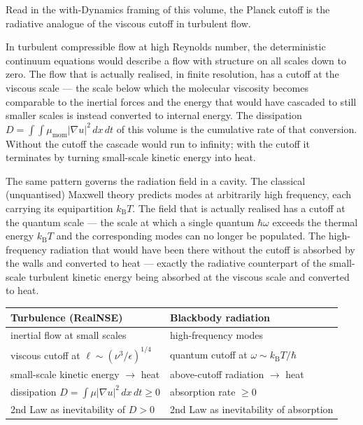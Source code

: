 Read in the with-Dynamics framing of this volume, the Planck cutoff is
the radiative analogue of the viscous cutoff in turbulent flow.

In turbulent compressible flow at high Reynolds number, the
deterministic continuum equations would describe a flow with structure
on all scales down to zero. The flow that is actually realised, in
finite resolution, has a cutoff at the viscous scale --- the scale
below which the molecular viscosity becomes comparable to the inertial
forces and the energy that would have cascaded to still smaller scales
is instead converted to internal energy. The dissipation
$D = \int\!\int \mu_{\mathrm{mom}}|\nabla u|^2\,dx\,dt$ of this volume
is the cumulative rate of that conversion. Without the cutoff the
cascade would run to infinity; with the cutoff it terminates by
turning small-scale kinetic energy into heat.

The same pattern governs the radiation field in a cavity. The
classical (unquantised) Maxwell theory predicts modes at arbitrarily
high frequency, each carrying its equipartition $k_{\mathrm{B}}T$. The
field that is actually realised has a cutoff at the quantum scale ---
the scale at which a single quantum $\hbar\omega$ exceeds the thermal
energy $k_{\mathrm{B}}T$ and the corresponding modes can no longer be
populated. The high-frequency radiation that would have been there
without the cutoff is absorbed by the walls and converted to heat ---
exactly the radiative counterpart of the small-scale turbulent kinetic
energy being absorbed at the viscous scale and converted to heat.

\begin{center}
\begin{tabular}{l|l}
\textbf{Turbulence (RealNSE)} & \textbf{Blackbody radiation} \\
\hline
inertial flow at small scales & high-frequency modes \\
viscous cutoff at $\ell \sim (\nu^3/\epsilon)^{1/4}$ &
quantum cutoff at $\omega \sim k_{\mathrm{B}}T/\hbar$ \\
small-scale kinetic energy $\to$ heat &
above-cutoff radiation $\to$ heat \\
dissipation $D = \int\mu|\nabla u|^2\,dx\,dt \geq 0$ &
absorption rate $\geq 0$ \\
2nd Law as inevitability of $D > 0$ &
2nd Law as inevitability of absorption \\
\end{tabular}
\end{center}

